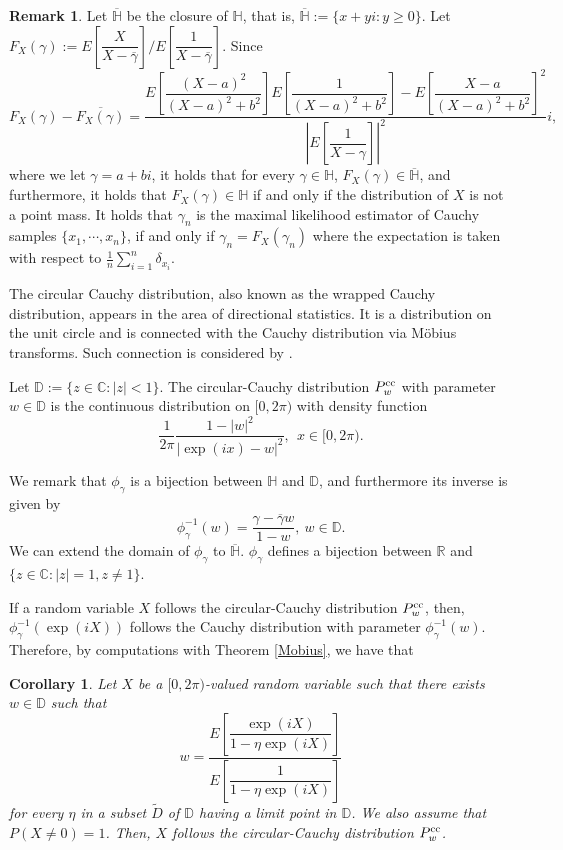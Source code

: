 \documentclass[a4paper, reqno, 11pt]{amsart}
\newtheorem{Cor}[Thm]{Corollary}
\theoremstyle{definition}
\newtheorem{Rem}[Thm]{Remark}
\begin{document}
\begin{Rem}\label{upper}
Let $\overline{\mathbb{H}}$ be the closure of $\mathbb{H}$, that is, $\overline{\mathbb{H}} := \{x+yi : y \ge 0\}$. 
Let $F_X (\gamma) := E\left[\dfrac{X}{X - \overline{\gamma}}\right] / E\left[\dfrac{1}{X - \overline{\gamma}}\right]$. 
Since 
\[ F_X (\gamma)  - \overline{F_X (\gamma)} = \dfrac{E\left[ \dfrac{(X-a)^2}{(X-a)^2 + b^2} \right]E\left[ \dfrac{1}{(X-a)^2 + b^2}\right] - E\left[ \dfrac{X-a}{(X-a)^2 + b^2}\right]^2}{\left|E\left[\dfrac{1}{X - \gamma}\right]\right|^2}i,\]
where we let $\gamma = a+bi$, 
it holds that for every $\gamma \in \mathbb{H}$, $F_X (\gamma) \in \overline{\mathbb H}$, and furthermore, it holds that 
$F_X (\gamma) \in \mathbb H$ if and only if the distribution of $X$ is not a point mass.  
It holds that 
$\gamma_n$ is the maximal likelihood estimator of Cauchy samples $\{x_1, \cdots, x_n\}$, 
if and only if 
$\gamma_n = F_X (\gamma_n)$ 
where the expectation  is taken with respect to $\displaystyle \frac{1}{n} \sum_{i=1}^{n} \delta_{x_i}$. 
\end{Rem}


The circular Cauchy distribution, also known as the wrapped Cauchy distribution, appears in the area of directional statistics. 
It is a distribution on the unit circle and is connected with the Cauchy distribution via M\"obius transforms.  
Such connection is considered by  \cite{McCullagh1996}. 
 
Let $\mathbb D := \{z \in \mathbb{C} : |z| < 1\}$. 
The circular-Cauchy distribution $P^{\textup{cc}}_w$ with parameter $w \in \mathbb{D}$ is the continuous distribution on $[0, 2\pi)$  
with density function 
\[  \frac{1}{2\pi} \frac{1 - |w|^2}{|\exp(ix) - w|^2}, \ \ x \in [0, 2\pi). \]

We remark that $\phi_{\gamma}$ is a bijection between $\mathbb H$ and $\mathbb D$, and furthermore its inverse is given by 
\[ \phi_{\gamma}^{-1}(w) = \frac{\gamma - \overline{\gamma}w}{1 - w}, \ w \in \mathbb{D}. \]
We can extend the domain of $\phi_{\gamma}$ to $\overline{\mathbb H}$. 
$\phi_{\gamma}$ defines a bijection between $\mathbb{R}$ and $\{z \in \mathbb{C} : |z| =1, z \ne 1\}$. 

If a random variable $X$ follows the circular-Cauchy distribution $P^{\textup{cc}}_{w}$, 
then, $\phi_{\gamma}^{-1}(\exp(iX))$ follows the Cauchy distribution with parameter $\phi_{\gamma}^{-1}(w)$. 
Therefore, by computations with Theorem \ref{Mobius}, 
we have that 
\begin{Cor}
Let $X$ be a $[0, 2\pi)$-valued random variable such that there exists $w \in \mathbb{D}$ such that 
\[ w = \frac{E\left[ \dfrac{\exp(iX)}{ 1 - \eta \exp(iX)} \right]}{E\left[ \dfrac{1}{1 - \eta  \exp(iX)} \right]} \]
for every $\eta$ in a subset $\widetilde D$ of $\mathbb{D}$ having a limit point in $\mathbb{D}$. 
We also assume that $P(X \ne 0) = 1$. %
Then, $X$ follows the circular-Cauchy distribution $P^{\textup{cc}}_{w}$. 
\end{Cor}
\end{document}
